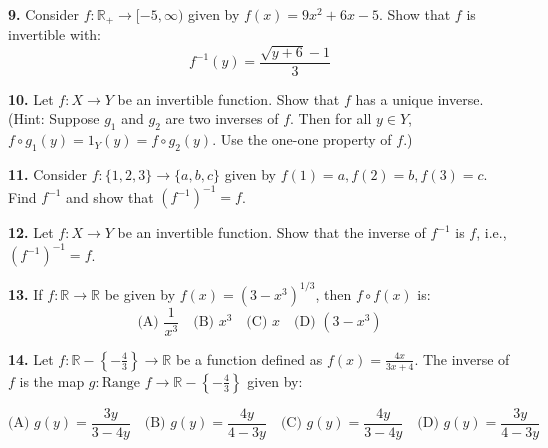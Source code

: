 \documentclass{article}
\begin{document}
\newpage
\textbf{9.} Consider $ f: \mathbb{R}_+ \to [-5, \infty) $ given by $ f(x) = 9x^2 + 6x - 5 $. Show that $ f $ is invertible with:
\[
f^{-1}(y) = \frac{\sqrt{y+6} -1}{3}
\]

\textbf{10.} Let $ f: X \to Y $ be an invertible function. Show that $ f $ has a unique inverse. 
(Hint: Suppose $ g_1 $ and $ g_2 $ are two inverses of $ f $. Then for all $ y \in Y $, 
$ f \circ g_1(y) = 1_Y(y) = f \circ g_2(y) $. Use the one-one property of $ f $.)

\textbf{11.} Consider $ f: \{1,2,3\} \to \{a,b,c\} $ given by $ f(1) = a, f(2) = b, f(3) = c $. Find $ f^{-1} $ and show that $ (f^{-1})^{-1} = f $.

\textbf{12.} Let $ f: X \to Y $ be an invertible function. Show that the inverse of $ f^{-1} $ is $ f $, i.e., $ (f^{-1})^{-1} = f $.

\textbf{13.} If $ f: \mathbb{R} \to \mathbb{R} $ be given by $ f(x) = (3 - x^3)^{1/3} $, then $ f \circ f(x) $ is:
\[
\text{(A) } \frac{1}{x^3} \quad \text{(B) } x^3 \quad \text{(C) } x \quad \text{(D) } (3 - x^3)
\]

\textbf{14.} Let $ f: \mathbb{R} - \left\{ -\frac{4}{3} \right\} \to \mathbb{R} $ be a function defined as $ f(x) = \frac{4x}{3x+4} $. The inverse of $ f $ is the map $ g: \text{Range } f \to \mathbb{R} - \left\{ -\frac{4}{3} \right\} $ given by:

\[
\text{(A) } g(y) = \frac{3y}{3 - 4y} \quad
\text{(B) } g(y) = \frac{4y}{4 - 3y} \quad
\text{(C) } g(y) = \frac{4y}{3 - 4y} \quad
\text{(D) } g(y) = \frac{3y}{4 - 3y}
\]
\end{document}
